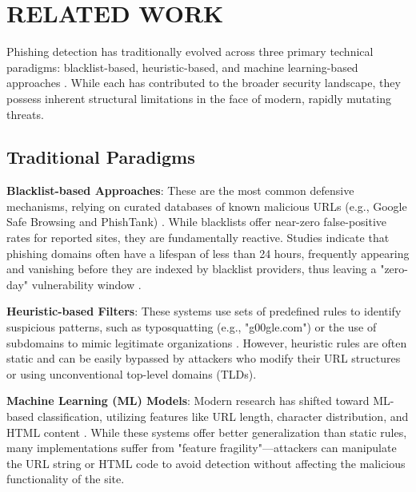 \section{RELATED WORK}
\label{sec:related_work}

Phishing detection has traditionally evolved across three primary technical paradigms: blacklist-based, heuristic-based, and machine learning-based approaches \cite{ref1, ref11}. While each has contributed to the broader security landscape, they possess inherent structural limitations in the face of modern, rapidly mutating threats.

\subsection{Traditional Paradigms}
\textbf{Blacklist-based Approaches}: These are the most common defensive mechanisms, relying on curated databases of known malicious URLs (e.g., Google Safe Browsing and PhishTank) \cite{ref13}. While blacklists offer near-zero false-positive rates for reported sites, they are fundamentally reactive. Studies indicate that phishing domains often have a lifespan of less than 24 hours, frequently appearing and vanishing before they are indexed by blacklist providers, thus leaving a "zero-day" vulnerability window \cite{ref3}.

\textbf{Heuristic-based Filters}: These systems use sets of predefined rules to identify suspicious patterns, such as typosquatting (e.g., "g00gle.com") or the use of subdomains to mimic legitimate organizations \cite{ref6}. However, heuristic rules are often static and can be easily bypassed by attackers who modify their URL structures or using unconventional top-level domains (TLDs).

\textbf{Machine Learning (ML) Models}: Modern research has shifted toward ML-based classification, utilizing features like URL length, character distribution, and HTML content \cite{ref12}. While these systems offer better generalization than static rules, many implementations suffer from "feature fragility"—attackers can manipulate the URL string or HTML code to avoid detection without affecting the malicious functionality of the site.

